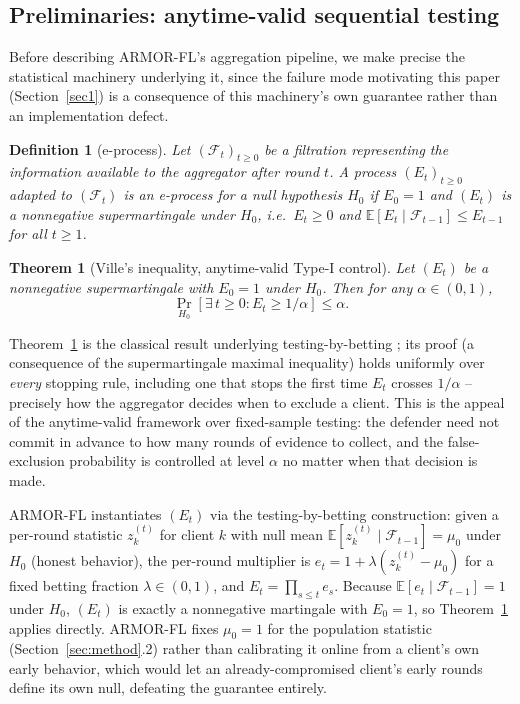 \documentclass[pdflatex,iicol,sn-mathphys-num]{sn-jnl}%
\theoremstyle{thmstyleone}%
\newtheorem{theorem}{Theorem}%
\theoremstyle{thmstyletwo}%
\theoremstyle{thmstylethree}%
\newtheorem{definition}{Definition}%
\begin{document}
\subsection{Preliminaries: anytime-valid sequential testing}\label{sec:prelim}

Before describing ARMOR-FL's aggregation pipeline, we make precise the statistical machinery underlying it, since the failure mode motivating this paper (Section~\ref{sec1}) is a consequence of this machinery's own guarantee rather than an implementation defect.

\begin{definition}[e-process]\label{def:eprocess}
Let $(\mathcal{F}_t)_{t \ge 0}$ be a filtration representing the information available to the aggregator after round $t$. A process $(E_t)_{t \ge 0}$ adapted to $(\mathcal{F}_t)$ is an \emph{e-process} for a null hypothesis $H_0$ if $E_0 = 1$ and $(E_t)$ is a nonnegative supermartingale under $H_0$, i.e.\ $E_t \ge 0$ and $\mathbb{E}[E_t \mid \mathcal{F}_{t-1}] \le E_{t-1}$ for all $t \ge 1$.
\end{definition}

\begin{theorem}[Ville's inequality, anytime-valid Type-I control]\label{thm:ville}
Let $(E_t)$ be a nonnegative supermartingale with $E_0 = 1$ under $H_0$. Then for any $\alpha \in (0,1)$,
\[
\Pr_{H_0}\!\left[\exists\, t \ge 0 : E_t \ge 1/\alpha\right] \le \alpha .
\]
\end{theorem}

Theorem~\ref{thm:ville} is the classical result underlying testing-by-betting \citep{waudbysmith2020betting}; its proof (a consequence of the supermartingale maximal inequality) holds uniformly over \emph{every} stopping rule, including one that stops the first time $E_t$ crosses $1/\alpha$ -- precisely how the aggregator decides when to exclude a client. This is the appeal of the anytime-valid framework over fixed-sample testing: the defender need not commit in advance to how many rounds of evidence to collect, and the false-exclusion probability is controlled at level $\alpha$ no matter when that decision is made.

ARMOR-FL instantiates $(E_t)$ via the testing-by-betting construction: given a per-round statistic $z_k^{(t)}$ for client $k$ with null mean $\mathbb{E}[z_k^{(t)} \mid \mathcal{F}_{t-1}] = \mu_0$ under $H_0$ (honest behavior), the per-round multiplier is $e_t = 1 + \lambda(z_k^{(t)} - \mu_0)$ for a fixed betting fraction $\lambda \in (0,1)$, and $E_t = \prod_{s \le t} e_s$. Because $\mathbb{E}[e_t \mid \mathcal{F}_{t-1}] = 1$ under $H_0$, $(E_t)$ is exactly a nonnegative martingale with $E_0=1$, so Theorem~\ref{thm:ville} applies directly. ARMOR-FL fixes $\mu_0 = 1$ for the population statistic (Section~\ref{sec:method}.2) rather than calibrating it online from a client's own early behavior, which would let an already-compromised client's early rounds define its own null, defeating the guarantee entirely.
\end{document}
